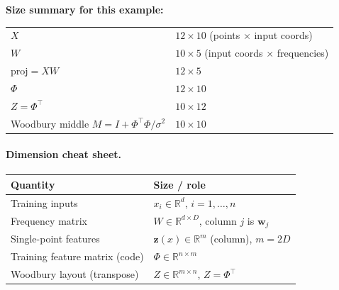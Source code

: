 \documentclass[11pt]{article}
\newcommand{\noise}{\sigma^2}
\newcommand{\Ph}{\Phi}
\newcommand{\Zmat}{Z}
\begin{document}
\begin{samebox}
\medskip
\noindent\textbf{Size summary for this example:}
\begin{center}
\renewcommand{\arraystretch}{1.15}
\begin{tabular}{@{}ll@{}}
$X$ & $12 \times 10$ (points $\times$ input coords) \\
$W$ & $10 \times 5$ (input coords $\times$ frequencies) \\
$\mathrm{proj}=XW$ & $12 \times 5$ \\
$\Ph$ & $12 \times 10$ \\
$\Zmat=\Ph^{\top}$ & $10 \times 12$ \\
Woodbury middle $M=I+\Ph^{\top}\Ph/\noise$ & $10 \times 10$ \\
\end{tabular}
\end{center}
\end{samebox}

\paragraph{Dimension cheat sheet.}
\begin{center}
\renewcommand{\arraystretch}{1.2}
\begin{tabular}{@{}ll@{}}
\toprule
\textbf{Quantity} & \textbf{Size / role} \\
\midrule
Training inputs & $x_i \in \mathbb{R}^d$, \quad $i=1,\ldots,n$ \\
Frequency matrix & $W \in \mathbb{R}^{d \times D}$, \quad column $j$ is $\mathbf w_j$ \\
Single-point features & $\mathbf z(x) \in \mathbb{R}^{m}$ (column), \quad $m=2D$ \\
Training feature matrix (code) & $\Ph \in \mathbb{R}^{n \times m}$ \\
Woodbury layout (transpose) & $\Zmat \in \mathbb{R}^{m \times n}$, \quad $\Zmat=\Ph^{\top}$ \\
\bottomrule
\end{tabular}
\end{center}
\end{document}
